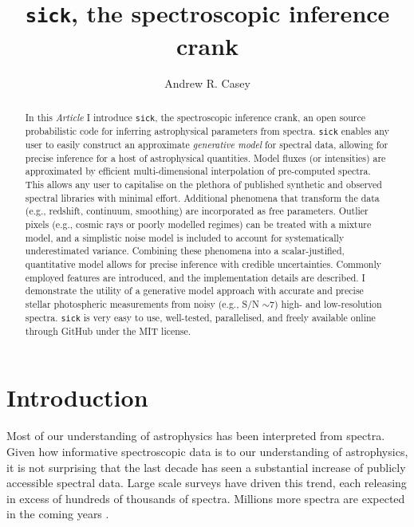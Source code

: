 \documentclass[iop]{emulateapj}
\newcommand{\sick}{\texttt{sick}}
\newcommand{\article}{\textit{Article}}
\begin{document}
\title{\sick, the spectroscopic inference crank}

\author{Andrew R. Casey}


\begin{abstract}
In this \article{}  I  introduce \sick{}, the spectroscopic inference crank, an 
open source probabilistic code for inferring astrophysical parameters from 
spectra. \sick{} enables any user to easily construct an approximate 
\textit{generative model} for spectral data, allowing for precise inference for 
a host of astrophysical quantities. Model fluxes (or intensities) are approximated 
by efficient multi-dimensional interpolation of pre-computed spectra. This allows 
any user to capitalise on the plethora of published synthetic and observed spectral 
libraries with minimal effort. Additional phenomena that transform the data 
(e.g., redshift, continuum, smoothing) are incorporated as free parameters. 
Outlier pixels (e.g., cosmic rays or poorly modelled regimes) can be treated with 
a mixture model, and a simplistic noise model is included to account for 
systematically underestimated variance. Combining these phenomena into a 
scalar-justified, quantitative model allows for precise inference with credible 
uncertainties. Commonly employed features are introduced, and the implementation 
details are described. I demonstrate the utility of a generative model approach 
with accurate and precise stellar photospheric measurements from noisy (e.g., 
S/N $\sim{} 7$) high- and low-resolution spectra. \sick{} is very easy to use, 
well-tested, parallelised, and freely available online through GitHub under the 
MIT license. 
\end{abstract}

\section{Introduction}
Most of our understanding of astrophysics has been interpreted from spectra. 
Given how informative spectroscopic data is to our understanding of astrophysics, 
it is not surprising that the last decade has seen a substantial increase of 
publicly accessible spectral data. Large scale surveys have driven this trend, 
each releasing in excess of hundreds of thousands \citep[e.g.,][]{wigglez,boss,
segue,rave,gaia-eso} of spectra. Millions more spectra are expected in the 
coming years \citep[e.g.,][]{lamost,galah}.
 
\end{document}
